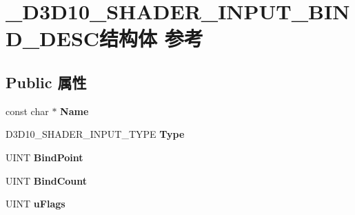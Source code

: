 \hypertarget{struct___d3_d10___s_h_a_d_e_r___i_n_p_u_t___b_i_n_d___d_e_s_c}{}\section{\+\_\+\+D3\+D10\+\_\+\+S\+H\+A\+D\+E\+R\+\_\+\+I\+N\+P\+U\+T\+\_\+\+B\+I\+N\+D\+\_\+\+D\+E\+S\+C结构体 参考}
\label{struct___d3_d10___s_h_a_d_e_r___i_n_p_u_t___b_i_n_d___d_e_s_c}
\subsection*{Public 属性}
\begin{DoxyCompactItemize}
\item 
\mbox{\label{struct___d3_d10___s_h_a_d_e_r___i_n_p_u_t___b_i_n_d___d_e_s_c_a310cc8413c74efd190f2294d0cf2b7a8}} 
const char $\ast$ {\bfseries Name}
\item 
\mbox{\label{struct___d3_d10___s_h_a_d_e_r___i_n_p_u_t___b_i_n_d___d_e_s_c_a1e29093be6915649850e01b6ae8eed35}} 
D3\+D10\+\_\+\+S\+H\+A\+D\+E\+R\+\_\+\+I\+N\+P\+U\+T\+\_\+\+T\+Y\+PE {\bfseries Type}
\item 
\mbox{\label{struct___d3_d10___s_h_a_d_e_r___i_n_p_u_t___b_i_n_d___d_e_s_c_aba24ca34c449efcc2c0ee8d5cd7d8760}} 
U\+I\+NT {\bfseries Bind\+Point}
\item 
\mbox{\label{struct___d3_d10___s_h_a_d_e_r___i_n_p_u_t___b_i_n_d___d_e_s_c_a8146aa1aa80cb891b1d5f734058121b6}} 
U\+I\+NT {\bfseries Bind\+Count}
\item 
\mbox{\label{struct___d3_d10___s_h_a_d_e_r___i_n_p_u_t___b_i_n_d___d_e_s_c_a0a572ab9eddd4d0e1bae4754c3968d6f}} 
U\+I\+NT {\bfseries u\+Flags}
\item 
\mbox{\label{struct___d3_d10___s_h_a_d_e_r___i_n_p_u_t___b_i_n_d___d_e_s_c_ad8126d0125e276b534933a50aa868abd}} 

\end{DoxyCompactItemize}
